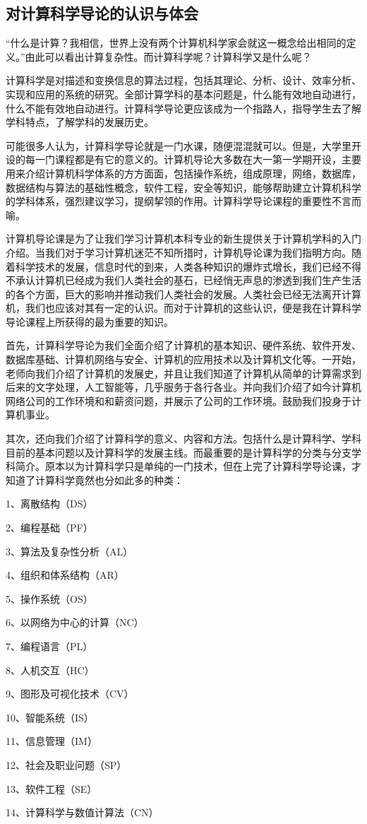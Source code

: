 \documentclass{article}
\begin{document}
\subsection{ 对计算科学导论的认识与体会
}
“什么是计算？我相信，世界上没有两个计算机科学家会就这一概念给出相同的定义。”由此可以看出计算复杂性。而计算科学呢？计算科学又是什么呢？\par 
计算科学是对描述和变换信息的算法过程，包括其理论、分析、设计、效率分析、实现和应用的系统的研究。全部计算学科的基本问题是，什么能有效地自动进行，什么不能有效地自动进行。计算科学导论更应该成为一个指路人，指导学生去了解学科特点，了解学科的发展历史。\par 
可能很多人认为，计算科学导论就是一门水课，随便混混就可以。但是，大学里开设的每一门课程都是有它的意义的。计算机导论大多数在大一第一学期开设，主要用来介绍计算机科学体系的方方面面，包括操作系统，组成原理，网络，数据库，数据结构与算法的基础性概念，软件工程，安全等知识，能够帮助建立计算机科学的学科体系，强烈建议学习，提纲挈领的作用。计算科学导论课程的重要性不言而喻。\par 
计算机导论课是为了让我们学习计算机本科专业的新生提供关于计算机学科的入门介绍。当我们对于学习计算机迷茫不知所措时，计算机导论课为我们指明方向。随着科学技术的发展，信息时代的到来，人类各种知识的爆炸式增长，我们已经不得不承认计算机已经成为我们人类社会的基石，已经悄无声息的渗透到我们生产生活的各个方面，巨大的影响并推动我们人类社会的发展。人类社会已经无法离开计算机，我们也应该对其有一定的认识。而对于计算机的这些认识，便是我在计算科学导论课程上所获得的最为重要的知识。\par 
首先，计算科学导论为我们全面介绍了计算机的基本知识、硬件系统、软件开发、数据库基础、计算机网络与安全、计算机的应用技术以及计算机文化等。一开始，老师向我们介绍了计算机的发展史，并且让我们知道了计算机从简单的计算需求到后来的文字处理，人工智能等，几乎服务于各行各业。并向我们介绍了如今计算机网络公司的工作环境和和薪资问题，并展示了公司的工作环境。鼓励我们投身于计算机事业。\par 
其次，还向我们介绍了计算科学的意义、内容和方法。包括什么是计算科学、学科目前的基本问题以及计算科学的发展主线。而最重要的是计算科学的分类与分支学科简介。原本以为计算科学只是单纯的一门技术，但在上完了计算科学导论课，才知道了计算科学竟然也分如此多的种类：\par 
1、离散结构（DS）\par 
2、编程基础（PF）\par 
3、算法及复杂性分析（AL）\par 
4、组织和体系结构（AR）\par 
5、操作系统（OS）\par 
6、以网络为中心的计算（NC）\par 
7、编程语言（PL）\par 
8、人机交互（HC）\par 
9、图形及可视化技术（CV）\par 
10、智能系统（IS）\par 
11、信息管理（IM）\par 
12、社会及职业问题（SP）\par 
13、软件工程（SE）\par 
14、计算科学与数值计算法（CN）\par 
\end{document}
